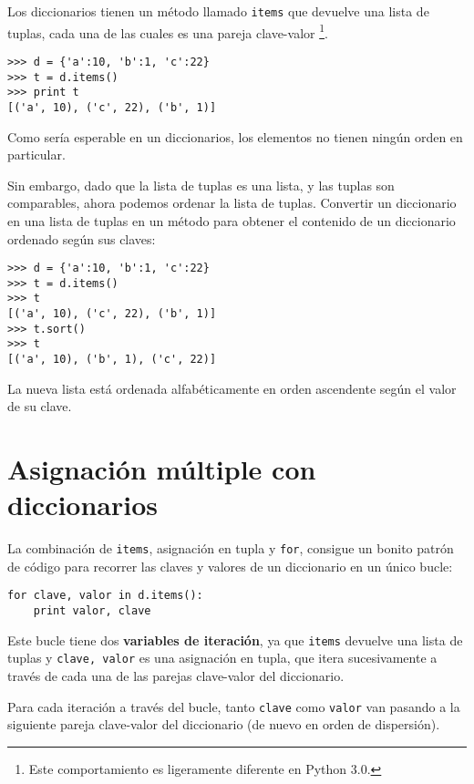 
Los diccionarios tienen un método llamado {\tt items} que devuelve una lista de
tuplas, cada una de las cuales es una pareja clave-valor
\footnote{Este comportamiento es ligeramente diferente en Python 3.0.}.

\beforeverb
\begin{verbatim}
>>> d = {'a':10, 'b':1, 'c':22}
>>> t = d.items()
>>> print t
[('a', 10), ('c', 22), ('b', 1)]
\end{verbatim}
\afterverb
%
Como sería esperable en un diccionarios, los elementos no
tienen ningún orden en particular.

Sin embargo, dado que la lista de tuplas es una lista, y las tuplas
son comparables, ahora podemos ordenar la lista de tuplas. Convertir un diccionario
en una lista de tuplas en un método para obtener el contenido de un
diccionario ordenado según sus claves:

\beforeverb
\begin{verbatim}
>>> d = {'a':10, 'b':1, 'c':22}
>>> t = d.items()
>>> t
[('a', 10), ('c', 22), ('b', 1)]
>>> t.sort()
>>> t
[('a', 10), ('b', 1), ('c', 22)]
\end{verbatim}
\afterverb
%
La nueva lista está ordenada alfabéticamente en orden ascendente según el valor de su clave.

\section{Asignación múltiple con diccionarios}


La combinación de {\tt items}, asignación en tupla y {\tt for},
consigue un bonito patrón de código para recorrer las claves y valores
de un diccionario en un único bucle:

\beforeverb
\begin{verbatim}
for clave, valor in d.items():
    print valor, clave
\end{verbatim}
\afterverb
%
Este bucle tiene dos {\bf variables de iteración}, ya que {\tt items} devuelve
una lista de tuplas y {\tt clave, valor} es una asignación en tupla,
que itera sucesivamente a través de cada una de las parejas clave-valor del
diccionario.

Para cada iteración a través del bucle, tanto {\tt clave} como {\tt valor} van
pasando a la siguiente pareja clave-valor del diccionario
(de nuevo en orden de dispersión).

